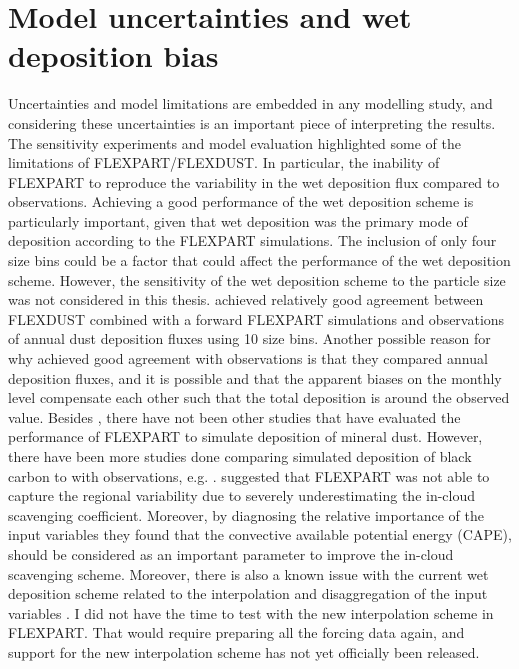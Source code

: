 \section{Model uncertainties and wet deposition bias}\label{sec:model_uncertainties}
Uncertainties and model limitations are embedded in any modelling study, and considering these uncertainties is an important piece of interpreting the results.  
The sensitivity experiments and model evaluation highlighted some of the limitations of FLEXPART/FLEXDUST. 
In particular, the inability of FLEXPART to reproduce the variability in the wet deposition flux compared to observations. 
Achieving a good performance of the wet deposition scheme is particularly important, given that wet deposition was the primary mode of deposition according to the FLEXPART simulations. 
The inclusion of only four size bins could be a factor that could affect the performance of the wet deposition scheme.
However, the sensitivity of the wet deposition scheme to the particle size was not considered in this thesis.
\textcite{flexdust_ref_2016} achieved relatively good agreement between FLEXDUST combined with a forward FLEXPART simulations and observations of annual dust deposition fluxes using 10 size bins. 
Another possible reason for why \textcite{flexdust_ref_2016} achieved good agreement with observations is that they compared annual deposition fluxes, and it is possible and that the apparent biases on the monthly level compensate each other such that the total deposition is around the observed value. 
Besides \textcite{flexdust_ref_2016}, there have not been other studies that have evaluated the performance of FLEXPART to simulate deposition of mineral dust.
However, there have been more studies done comparing simulated deposition of black carbon to with observations, e.g. \textcite{flexpart_wetdep, choi_investigation_2020}. 
\textcite{choi_investigation_2020} suggested that FLEXPART was not able to capture the regional variability due to severely underestimating the in-cloud scavenging coefficient. Moreover, by diagnosing the relative importance of the input variables 
they found that the convective available potential energy (CAPE), should be considered as an important parameter to improve the in-cloud scavenging scheme. 
Moreover, there is also a known issue with the current wet deposition scheme related to the interpolation and disaggregation of the input variables \parencite{tipka2021effects}. 
I did not have the time to test with the new interpolation scheme in FLEXPART. 
That would require preparing all the forcing data again, and support for the new interpolation scheme has not yet officially been released.

